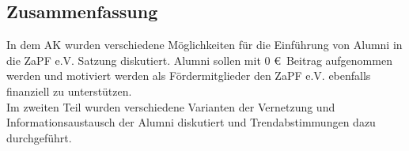   \subsection*{Zusammenfassung}
    In dem AK wurden verschiedene Möglichkeiten für die Einführung von Alumni in die ZaPF e.V. Satzung diskutiert. Alumni sollen mit $0$ \euro\ Beitrag aufgenommen werden und motiviert werden als Fördermitglieder den ZaPF e.V. ebenfalls finanziell zu unterstützen. \\
    Im zweiten Teil wurden verschiedene Varianten der Vernetzung und Informationsaustausch der Alumni diskutiert und Trendabstimmungen dazu durchgeführt.

